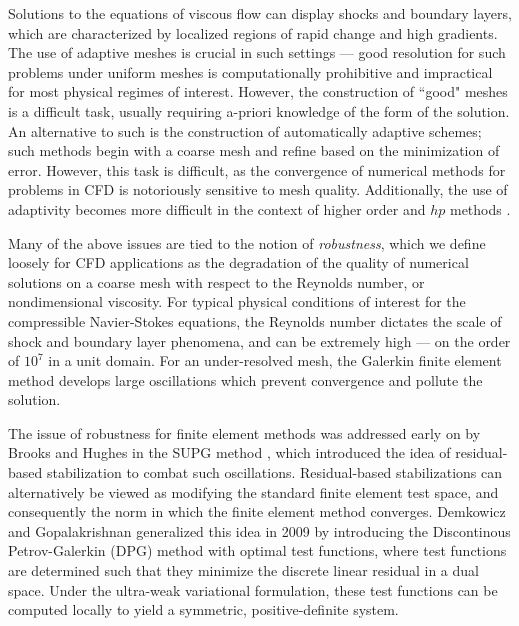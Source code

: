 Solutions to the equations of viscous flow can display shocks and boundary layers, which are characterized by localized regions of rapid change and high gradients.  The use of adaptive meshes is crucial in such settings --- good resolution for such problems under uniform meshes is computationally prohibitive and impractical for most physical regimes of interest.  However, the construction of ``good" meshes is a difficult task, usually requiring a-priori knowledge of the form of the solution.  An alternative to such is the construction of automatically adaptive schemes; such methods begin with a coarse mesh and refine based on the minimization of error.  However, this task is difficult, as the convergence of numerical methods for problems in CFD is notoriously sensitive to mesh quality.  Additionally, the use of adaptivity becomes more difficult in the context of higher order and $hp$ methods \cite{BoeingHigherOrder}.  

Many of the above issues are tied to the notion of \emph{robustness}, which we define loosely for CFD applications as the degradation of the quality of numerical solutions on a coarse mesh with respect to the Reynolds number, or nondimensional viscosity. For typical physical conditions of interest for the compressible Navier-Stokes equations, the Reynolds number dictates the scale of shock and boundary layer phenomena, and can be extremely high --- on the order of $10^7$ in a unit domain.  For an under-resolved mesh, the Galerkin finite element method develops large oscillations which prevent convergence and pollute the solution.  

The issue of robustness for finite element methods was addressed early on by Brooks and Hughes in the SUPG method \cite{SUPG}, which introduced the idea of residual-based stabilization to combat such oscillations. Residual-based stabilizations can alternatively be viewed as modifying the standard finite element test space, and consequently the norm in which the finite element method converges. Demkowicz and Gopalakrishnan generalized this idea in 2009 by introducing the Discontinous Petrov-Galerkin (DPG) method with optimal test functions, where test functions are determined such that they minimize the discrete linear residual in a dual space.  Under the ultra-weak variational formulation, these test functions can be computed locally to yield a symmetric, positive-definite system.  %

